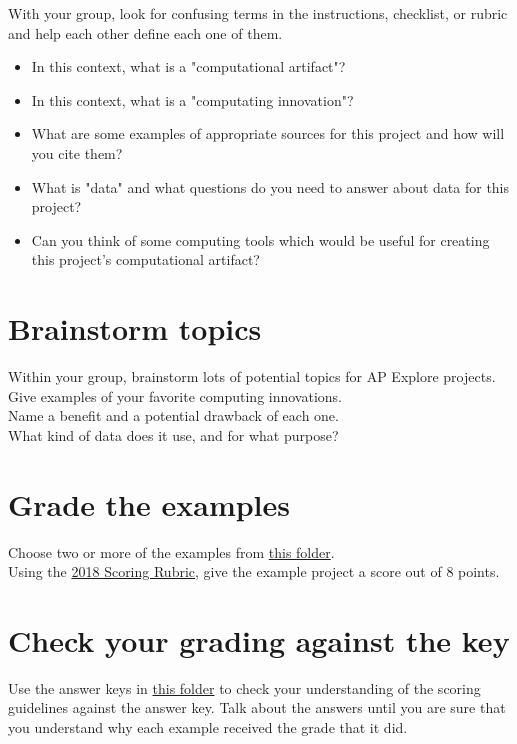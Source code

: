 \documentclass{42-en}
\begin{document}
With your group, look for confusing terms in the instructions, checklist, or rubric and help each other define each one of them.

\begin{itemize}
	\item In this context, what is a "computational artifact"?
	\item In this context, what is a "computating innovation"?
	\item What are some examples of appropriate sources for this project and how will you cite them?
	\item What is "data" and what questions do you need to answer about data for this project?
	\item Can you think of some computing tools which would be useful for creating this project's computational artifact?
\end{itemize} 

\section{Brainstorm topics}

Within your group, brainstorm lots of potential topics for AP Explore projects. Give examples of your favorite computing innovations.\\

Name a benefit and a potential drawback of each one.\\
What kind of data does it use, and for what purpose?\\

\section{Grade the examples}

Choose two or more of the examples from \href{https://drive.google.com/open?id=0BwtvDcLkkxXgMEtURjQwUTFqa0k}{this folder}.\\

Using the \href{https://drive.google.com/open?id=0BwtvDcLkkxXgb0NzNE90cjlOOVU}{2018 Scoring Rubric}, give the example project a score out of 8 points.\\

\section{Check your grading against the key}

Use the answer keys in \href{https://drive.google.com/open?id=0BwtvDcLkkxXgbGpvS3BQQ2otRGs}{this folder} to check your understanding of the scoring guidelines against the answer key. Talk about the answers until you are sure that you understand why each example received the grade that it did.
\end{document}
